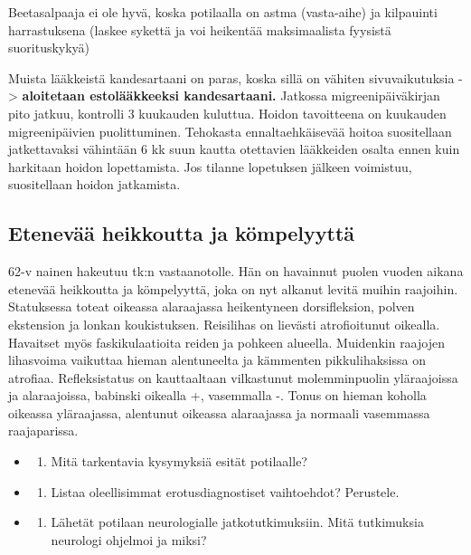\documentclass[
]{book}
\providecommand{\tightlist}{%
  \setlength{\itemsep}{0pt}\setlength{\parskip}{0pt}}
\begin{document}
Beetasalpaaja ei ole hyvä, koska potilaalla on astma (vasta-aihe) ja kilpauinti harrastuksena (laskee sykettä ja voi heikentää maksimaalista fyysistä suorituskykyä)

Muista lääkkeistä kandesartaani on paras, koska sillä on vähiten sivuvaikutuksia -\textgreater{} \textbf{aloitetaan estolääkkeeksi kandesartaani.} Jatkossa migreenipäiväkirjan pito jatkuu, kontrolli 3 kuukauden kuluttua. Hoidon tavoitteena on kuukauden migreenipäivien puolittuminen. Tehokasta ennaltaehkäisevää hoitoa suositellaan jatkettavaksi vähintään 6 kk suun kautta otettavien lääkkeiden osalta ennen kuin harkitaan hoidon lopettamista. Jos tilanne lopetuksen jälkeen voimistuu, suositellaan hoidon jatkamista.

\subsection{Etenevää heikkoutta ja kömpelyyttä}\label{etenevuxe4uxe4-heikkoutta-ja-kuxf6mpelyyttuxe4}

62-v nainen hakeutuu tk:n vastaanotolle. Hän on havainnut puolen vuoden aikana etenevää heikkoutta ja kömpelyyttä, joka on nyt alkanut levitä muihin raajoihin. Statuksessa toteat oikeassa alaraajassa heikentyneen dorsifleksion, polven ekstension ja lonkan koukistuksen. Reisilihas on lievästi atrofioitunut oikealla. Havaitset myös faskikulaatioita reiden ja pohkeen alueella. Muidenkin raajojen lihasvoima vaikuttaa hieman alentuneelta ja kämmenten pikkulihaksissa on atrofiaa. Refleksistatus on kauttaaltaan vilkastunut molemminpuolin yläraajoissa ja alaraajoissa, babinski oikealla +, vasemmalla -. Tonus on hieman koholla oikeassa yläraajassa, alentunut oikeassa alaraajassa ja normaali vasemmassa raajaparissa.

\begin{itemize}
\tightlist
\item
  \begin{enumerate}
  \def\labelenumi{\alph{enumi}.}
  \tightlist
  \item
    Mitä tarkentavia kysymyksiä esität potilaalle?
  \end{enumerate}
\item
  \begin{enumerate}
  \def\labelenumi{\alph{enumi}.}
  \setcounter{enumi}{1}
  \tightlist
  \item
    Listaa oleellisimmat erotusdiagnostiset vaihtoehdot? Perustele.
  \end{enumerate}
\item
  \begin{enumerate}
  \def\labelenumi{\alph{enumi}.}
  \setcounter{enumi}{2}
  \tightlist
  \item
    Lähetät potilaan neurologialle jatkotutkimuksiin. Mitä tutkimuksia neurologi ohjelmoi ja miksi?
  \end{enumerate}
\end{itemize}
\end{document}
